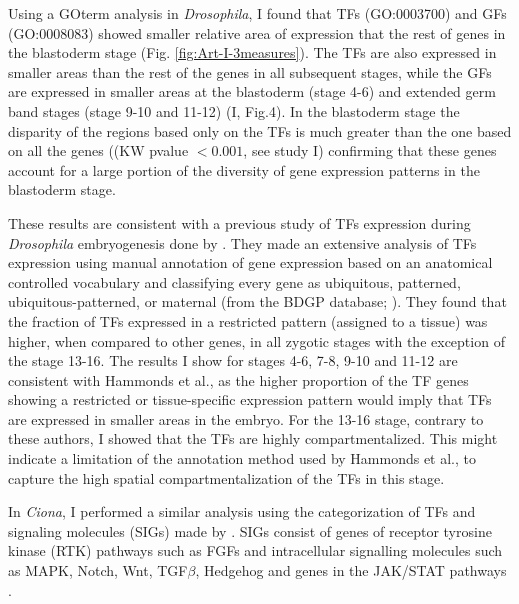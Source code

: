
Using a GOterm analysis in \textit{Drosophila}, I found that TFs (GO:0003700) and GFs (GO:0008083) showed smaller relative area of expression that the rest of genes in the blastoderm stage (Fig. \ref{fig:Art-I-3measures}).
%
The TFs are also expressed in smaller areas than the rest of the genes in all subsequent stages, while the GFs are expressed in smaller areas at the blastoderm (stage 4-6) and extended germ band stages (stage 9-10 and 11-12) (I, Fig.4). In the blastoderm stage the disparity of the regions based only on the TFs is much greater than the one based on all the genes ((KW pvalue $<0.001$, see study I) confirming that these genes account for a large portion of the diversity of gene expression patterns in the blastoderm stage.

These results are consistent with a previous study of TFs expression during \textit{Drosophila} embryogenesis done by \citet{Hammonds2013}.
They made an extensive analysis of TFs expression using manual annotation of gene expression based on an anatomical controlled vocabulary and classifying every gene as ubiquitous, patterned, ubiquitous-patterned, or maternal (from the BDGP database; \citealp{Tomancak2007}).
They found that the fraction of TFs expressed in a restricted pattern (assigned to a tissue) was higher, when compared to other genes, in all zygotic stages with the exception of the stage 13-16. 
The results I show for stages 4-6, 7-8, 9-10 and 11-12 are consistent with Hammonds et al., as the higher proportion of the TF genes showing a restricted or tissue-specific expression pattern would imply that TFs are expressed in smaller areas in the embryo. For the 13-16 stage, contrary to these authors, I showed that the TFs are highly compartmentalized. This might indicate a limitation of the annotation method used by Hammonds et al., to capture the high spatial compartmentalization of the TFs in this stage.

%

In \textit{Ciona}, I performed a similar analysis using the categorization of TFs and signaling molecules (SIGs) made by \citet{Imai2004}.
SIGs consist of genes of receptor tyrosine kinase (RTK) pathways such as FGFs and intracellular signalling molecules such as MAPK, Notch, Wnt, TGF$\beta$, Hedgehog and genes in the JAK/STAT pathways \citep{Imai2004}. 

